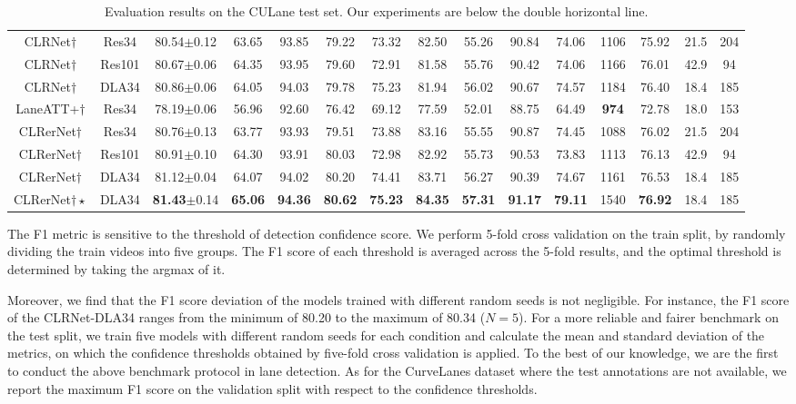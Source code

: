 \documentclass[10pt,twocolumn,letterpaper]{article}
\begin{document}
\begin{table*}
\begin{adjustbox}{width=\textwidth}
\begin{tabular}{ccccccccccccccc}
CLRNet$\dagger$  & Res34 & 80.54\footnotesize{$\pm$0.12} &63.65 & 93.85 & 79.22 & 73.32 & 82.50 & 55.26 & 90.84 & 74.06 & 1106 & 75.92 &  21.5 & 204 \\
CLRNet$\dagger$  & Res101 &80.67\footnotesize{$\pm$0.06} &64.35 & 93.95 & 79.60 & 72.91 & 81.58 & 55.76 & 90.42 & 74.06 & 1166 & 76.01 & 42.9 & 94 \\
CLRNet$\dagger$  & DLA34 & 80.86\footnotesize{$\pm$0.06} &64.05 & 94.03 & 79.78 & 75.23 & 81.94 & 56.02 & 90.67 & 74.57 & 1184 & 76.40 & 18.4 &  185 \\
\hline
LaneATT+$\dagger$ & Res34 &78.19\footnotesize{$\pm$0.06} &56.96 & 92.60 & 76.42 & 69.12 & 77.59 & 52.01 & 88.75 & 64.49 & \textbf{974} & 72.78 & 18.0 & 153 \\
CLRerNet$\dagger$ & Res34 & 80.76\footnotesize{$\pm$0.13} &63.77 & 93.93 & 79.51 & 73.88 & 83.16 & 55.55 & 90.87 & 74.45 & 1088 & 76.02 &  21.5 &  204 \\
CLRerNet$\dagger$ & Res101 & 80.91\footnotesize{$\pm$0.10} &64.30 & 93.91 & 80.03 & 72.98 & 82.92 & 55.73 & 90.53 & 73.83 & 1113 & 76.13 &   42.9 & 94 \\
CLRerNet$\dagger$ & DLA34 & 81.12\footnotesize{$\pm$0.04} & 64.07 & 94.02 & 80.20 & 74.41 & 83.71 & 56.27 & 90.39 & 74.67 & 1161 & 76.53 &    18.4 & 185 \\
\hline
CLRerNet$\dagger\star$ & DLA34 & \textbf{81.43}\footnotesize{$\pm$0.14} & \textbf{65.06} & \textbf{94.36} & \textbf{80.62} & \textbf{75.23} & \textbf{84.35} & \textbf{57.31} & \textbf{91.17} & \textbf{79.11} & 1540 & \textbf{76.92} &    18.4 & 185 \\
\hline
\end{tabular}
\end{adjustbox}
\caption{Evaluation results on the CULane test set. Our experiments are below the double horizontal line.}
\label{table:sota_culane}
\end{table*}


The F1 metric is sensitive to the threshold of detection confidence score. 
We perform 5-fold cross validation on the train split, by randomly dividing the train videos into five groups. 
The F1 score of each threshold is averaged across the 5-fold results, and the optimal threshold is determined by taking the argmax of it.

Moreover, we find that the F1 score deviation of the models trained with different random seeds is not negligible.
For instance, the F1 score of the CLRNet-DLA34 ranges from the minimum of 80.20 to the maximum of 80.34 ($N=5$). 
For a more reliable and fairer benchmark on the test split, we train five models with different random seeds for each condition and calculate the mean and standard deviation of the metrics, on which the confidence thresholds obtained by five-fold cross validation is applied.
To the best of our knowledge, we are the first to conduct the above benchmark protocol in lane detection.
As for the CurveLanes dataset where the test annotations are not available, we report the maximum F1 score on the validation split with respect to the confidence thresholds.
\end{document}
